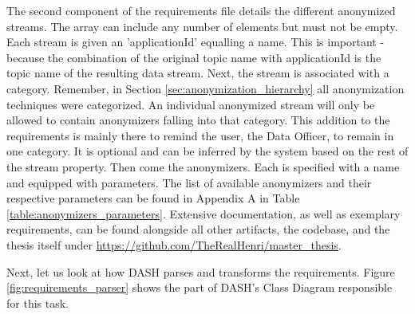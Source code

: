 The second component of the requirements file details the different anonymized streams. The array can include any number of elements but must not be empty. Each stream is given an 'applicationId' equalling a name. This is important - because the combination of the original topic name with applicationId is the topic name of the resulting data stream. Next, the stream is associated with a category. Remember, in Section \ref{sec:anonymization_hierarchy} all anonymization techniques were categorized. An individual anonymized stream will only be allowed to contain anonymizers falling into that category. This addition to the requirements is mainly there to remind the user, the Data Officer, to remain in one category. It is optional and can be inferred by the system based on the rest of the stream property. Then come the anonymizers. Each is specified with a name and equipped with parameters. The list of available anonymizers and their respective parameters can be found in Appendix A in Table \ref{table:anonymizers_parameters}. Extensive documentation, as well as exemplary requirements, can be found alongside all other artifacts, the codebase, and the thesis itself under \url{https://github.com/TheRealHenri/master_thesis}. \par
Next, let us look at how \ac{DASH} parses and transforms the requirements. Figure \ref{fig:requirements_parser} shows the part of \ac{DASH}'s Class Diagram responsible for this task.\par

